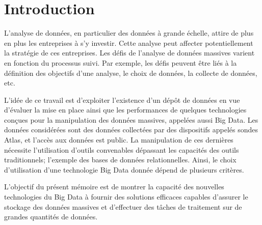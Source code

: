 \chapter*{Introduction}


L'analyse de données, en particulier des données à grande échelle, attire de plus en plus les entreprises à s'y investir.  Cette analyse peut affecter potentiellement la stratégie de ces entreprises. 
Les défis de l'analyse de données massives varient en fonction du processus suivi. Par exemple, les défis peuvent être liés à la définition  des objectifs d'une analyse, le choix de données, la collecte de données, etc.


L'idée de ce travail est  d'exploiter l'existence d'un dépôt de données en vue d'évaluer la mise en place ainsi que les performances de quelques technologies conçues pour la manipulation des données massives, appelées aussi Big Data.
Les données considérées sont des données  collectées par des dispositifs appelés sondes Atlas,  et  l'accès aux données est public. 
 La manipulation de ces dernières nécessite l'utilisation d'outils convenables dépassant les capacités des outils traditionnels; l'exemple des bases de données relationnelles.  Ainsi, le choix d'utilisation d'une technologie Big Data donnée dépend de plusieurs critères. 


L'objectif du présent mémoire est de montrer la capacité des nouvelles technologies du Big Data à fournir des solutions efficaces capables d'assurer le stockage des données massives et d'effectuer des tâches de traitement sur de grandes quantités de données. 


